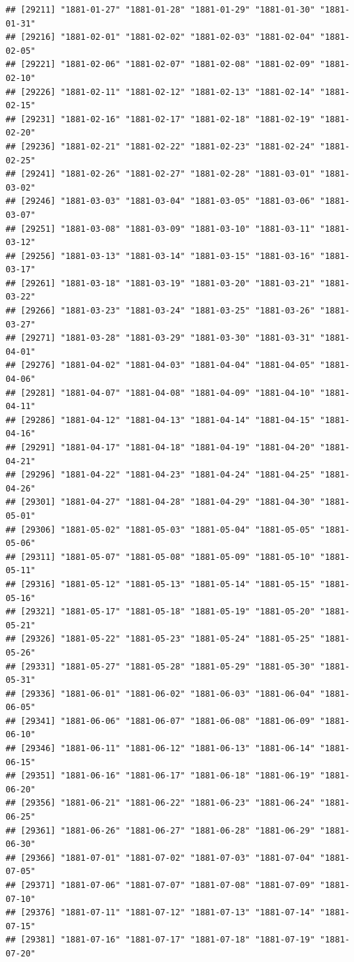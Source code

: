 \documentclass{article}\usepackage[]{graphicx}\usepackage[]{color}
\makeatletter
\newenvironment{kframe}{%
 \def\at@end@of@kframe{}%
 \ifinner\ifhmode%
  \def\at@end@of@kframe{\end{minipage}}%
  \begin{minipage}{\columnwidth}%
 \fi\fi%
 \def\FrameCommand##1{\hskip\@totalleftmargin \hskip-\fboxsep
 \colorbox{shadecolor}{##1}\hskip-\fboxsep
     \hskip-\linewidth \hskip-\@totalleftmargin \hskip\columnwidth}%
 \MakeFramed {\advance\hsize-\width
   \@totalleftmargin\z@ \linewidth\hsize
   \@setminipage}}%
 {\par\unskip\endMakeFramed%
 \at@end@of@kframe}
\newenvironment{knitrout}{}{} %
\makeatother
\begin{document}
\begin{description}
\begin{knitrout}
\begin{kframe}
\begin{verbatim}
## [29211] "1881-01-27" "1881-01-28" "1881-01-29" "1881-01-30" "1881-01-31"
## [29216] "1881-02-01" "1881-02-02" "1881-02-03" "1881-02-04" "1881-02-05"
## [29221] "1881-02-06" "1881-02-07" "1881-02-08" "1881-02-09" "1881-02-10"
## [29226] "1881-02-11" "1881-02-12" "1881-02-13" "1881-02-14" "1881-02-15"
## [29231] "1881-02-16" "1881-02-17" "1881-02-18" "1881-02-19" "1881-02-20"
## [29236] "1881-02-21" "1881-02-22" "1881-02-23" "1881-02-24" "1881-02-25"
## [29241] "1881-02-26" "1881-02-27" "1881-02-28" "1881-03-01" "1881-03-02"
## [29246] "1881-03-03" "1881-03-04" "1881-03-05" "1881-03-06" "1881-03-07"
## [29251] "1881-03-08" "1881-03-09" "1881-03-10" "1881-03-11" "1881-03-12"
## [29256] "1881-03-13" "1881-03-14" "1881-03-15" "1881-03-16" "1881-03-17"
## [29261] "1881-03-18" "1881-03-19" "1881-03-20" "1881-03-21" "1881-03-22"
## [29266] "1881-03-23" "1881-03-24" "1881-03-25" "1881-03-26" "1881-03-27"
## [29271] "1881-03-28" "1881-03-29" "1881-03-30" "1881-03-31" "1881-04-01"
## [29276] "1881-04-02" "1881-04-03" "1881-04-04" "1881-04-05" "1881-04-06"
## [29281] "1881-04-07" "1881-04-08" "1881-04-09" "1881-04-10" "1881-04-11"
## [29286] "1881-04-12" "1881-04-13" "1881-04-14" "1881-04-15" "1881-04-16"
## [29291] "1881-04-17" "1881-04-18" "1881-04-19" "1881-04-20" "1881-04-21"
## [29296] "1881-04-22" "1881-04-23" "1881-04-24" "1881-04-25" "1881-04-26"
## [29301] "1881-04-27" "1881-04-28" "1881-04-29" "1881-04-30" "1881-05-01"
## [29306] "1881-05-02" "1881-05-03" "1881-05-04" "1881-05-05" "1881-05-06"
## [29311] "1881-05-07" "1881-05-08" "1881-05-09" "1881-05-10" "1881-05-11"
## [29316] "1881-05-12" "1881-05-13" "1881-05-14" "1881-05-15" "1881-05-16"
## [29321] "1881-05-17" "1881-05-18" "1881-05-19" "1881-05-20" "1881-05-21"
## [29326] "1881-05-22" "1881-05-23" "1881-05-24" "1881-05-25" "1881-05-26"
## [29331] "1881-05-27" "1881-05-28" "1881-05-29" "1881-05-30" "1881-05-31"
## [29336] "1881-06-01" "1881-06-02" "1881-06-03" "1881-06-04" "1881-06-05"
## [29341] "1881-06-06" "1881-06-07" "1881-06-08" "1881-06-09" "1881-06-10"
## [29346] "1881-06-11" "1881-06-12" "1881-06-13" "1881-06-14" "1881-06-15"
## [29351] "1881-06-16" "1881-06-17" "1881-06-18" "1881-06-19" "1881-06-20"
## [29356] "1881-06-21" "1881-06-22" "1881-06-23" "1881-06-24" "1881-06-25"
## [29361] "1881-06-26" "1881-06-27" "1881-06-28" "1881-06-29" "1881-06-30"
## [29366] "1881-07-01" "1881-07-02" "1881-07-03" "1881-07-04" "1881-07-05"
## [29371] "1881-07-06" "1881-07-07" "1881-07-08" "1881-07-09" "1881-07-10"
## [29376] "1881-07-11" "1881-07-12" "1881-07-13" "1881-07-14" "1881-07-15"
## [29381] "1881-07-16" "1881-07-17" "1881-07-18" "1881-07-19" "1881-07-20"

\end{verbatim}
\end{kframe}
\end{knitrout}
\end{description}
\end{document}
